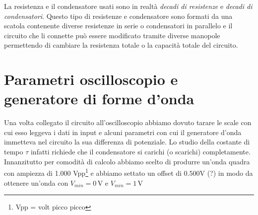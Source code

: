 La resistenza e il condensatore usati sono in realtà \textit{decadi di resistenze} e \textit{decadi di condensatori}. Questo tipo di resistenze e condensatore sono formati da una scatola contenente diverse resistenze in serie o condensatori in parallelo e il circuito che li connette può essere modificato tramite diverse manopole permettendo di cambiare la resistenza totale o la capacità totale del circuito.

\section{Parametri oscilloscopio e generatore di forme d'onda}

Una volta collegato il circuito all'oscilloscopio abbiamo dovuto tarare le scale con cui esso leggeva i dati in input e alcuni parametri con cui il generatore d'onda immetteva nel circuito la sua differenza di potenziale. Lo studio della costante di tempo $\tau$ infatti richiede che il condensatore si carichi (o scarichi) completamente.
Innanzitutto per comodità di calcolo abbiamo scelto di produrre un'onda quadra con ampiezza di 1.000 Vpp\footnote{Vpp = volt picco picco} e abbiamo settato un offset di $0.500\si{\volt}$ (?) in modo da ottenere un'onda con $V_{min}=0\,\si{\volt}$ e $V_{min}=1\,\si{\volt}$
